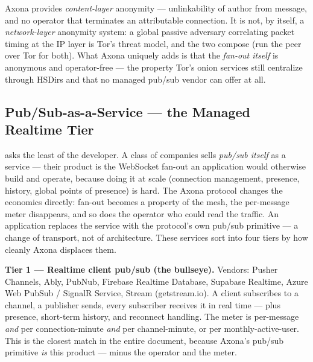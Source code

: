 \documentclass[nobib]{tufte-handout}
\begin{document}
 Axona provides \emph{content-layer}
anonymity --- unlinkability of author from message, and no operator that
terminates an attributable connection. It is not, by itself, a
\emph{network-layer} anonymity system: a global passive adversary
correlating packet timing at the IP layer is Tor's threat model, and the
two compose (run the peer over Tor for both). What Axona uniquely adds is
that the \emph{fan-out itself} is anonymous and operator-free --- the
property Tor's onion services still centralize through HSDirs and that no
managed pub/sub vendor can offer at all.

\subsection{Pub/Sub-as-a-Service --- the Managed Realtime Tier}

 asks the least of the developer. A
class of companies sells \emph{pub/sub itself} as a service --- their
product is the WebSocket fan-out an application would otherwise build and
operate, because doing it at scale (connection management, presence,
history, global points of presence) is hard. The Axona protocol changes
the economics directly: fan-out becomes a property of the mesh, the
per-message meter disappears, and so does the operator who could read the
traffic. An application replaces the service with the protocol's own
pub/sub primitive --- a change of transport, not of architecture. These
services sort into four tiers by how cleanly Axona displaces them.

\textbf{Tier 1 --- Realtime client pub/sub (the bullseye).} Vendors:
Pusher Channels, Ably, PubNub, Firebase Realtime Database, Supabase
Realtime, Azure Web PubSub / SignalR Service, Stream
(getstream.io). A client subscribes to a channel, a publisher sends,
every subscriber receives it in real time --- plus presence, short-term
history, and reconnect handling. The meter is per-message \emph{and} per
connection-minute \emph{and} per channel-minute, or per monthly-active-user. This is the
closest match in the entire document, because Axona's pub/sub primitive
\emph{is} this product --- minus the operator and the meter.
\end{document}
